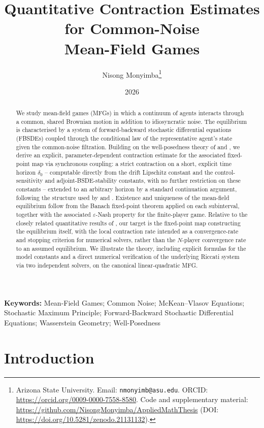 \documentclass[11pt]{article}
\title{Quantitative Contraction Estimates for Common-Noise\\ Mean-Field Games}
\author{Nisong Monyimba\thanks{Arizona State University. Email: \texttt{nmonyimb@asu.edu}. ORCID: \url{https://orcid.org/0009-0000-7558-8580}. Code and supplementary material: \url{https://github.com/NisongMonyimba/AppliedMathThesis} (DOI: \url{https://doi.org/10.5281/zenodo.21131132}).}}
\date{2026}
\theoremstyle{remark}
\begin{document}
\maketitle

\begin{abstract}
We study mean-field games (MFGs) in which a continuum of agents interacts through a
common, shared Brownian motion in addition to idiosyncratic noise. The equilibrium is
characterised by a system of forward-backward stochastic differential equations
(FBSDEs) coupled through the conditional law of the representative agent's state given
the common-noise filtration. Building on the well-posedness theory of
\citet{carmonadelarue2018} and \citet{ahujarenyang2019}, we derive an explicit,
parameter-dependent contraction estimate for the associated fixed-point map via
synchronous coupling: a strict contraction on a short, explicit time horizon
$\delta_0$ -- computable directly from the drift Lipschitz constant and the
control-sensitivity and adjoint-BSDE-stability constants, with no further
restriction on these constants -- extended to an arbitrary horizon by a standard
continuation argument, following the structure used by \citet{ahujarenyang2019} and \citet{qiao2025}.
Existence and uniqueness
of the mean-field equilibrium follow from the Banach fixed-point theorem applied
on each subinterval, together with the associated $\varepsilon$-Nash property for
the finite-player game. Relative to the closely related quantitative results of
\citet{jacksontangpi2024,jacksonmeszaros2025}, our target is the fixed-point map
constructing the equilibrium itself, with the local contraction rate intended as
a convergence-rate and stopping criterion for numerical solvers, rather than the
$N$-player convergence rate to an assumed equilibrium. We
illustrate the theory, including explicit formulas for the model constants and a
direct numerical verification of the underlying Riccati system via two
independent solvers, on the canonical linear-quadratic MFG.
\end{abstract}

\noindent\textbf{Keywords:} Mean-Field Games; Common Noise; McKean--Vlasov Equations; Stochastic Maximum
Principle; Forward-Backward Stochastic Differential Equations; Wasserstein Geometry; Well-Posedness

\section{Introduction}
\label{sec:intro}
\end{document}
